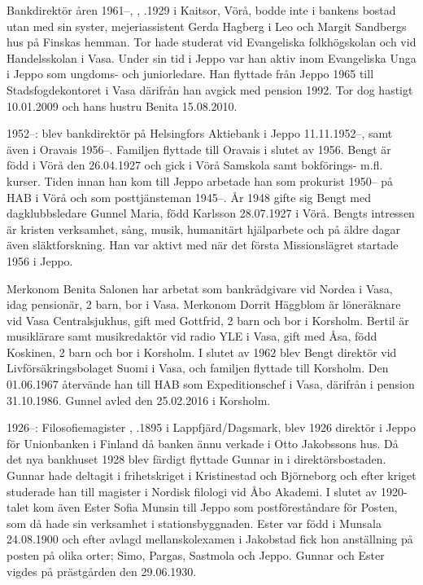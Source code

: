 Bankdirektör åren 1961--, , .1929 i Kaitsor, Vörå, bodde inte i bankens bostad utan med sin syster, mejeriassistent Gerda Hagberg i Leo och Margit Sandbergs hus på Finskas hemman. Tor hade studerat vid Evangeliska folkhögskolan och vid Handelsskolan i Vasa. Under sin tid i Jeppo var han aktiv inom Evangeliska Unga i	Jeppo som ungdoms- och juniorledare. Han flyttade från Jeppo 1965 till Stadsfogdekontoret i Vasa därifrån han avgick med pension 1992. Tor dog hastigt 10.01.2009 och hans hustru Benita 15.08.2010.


1952--:
 blev bankdirektör på Helsingfors Aktiebank i Jeppo 11.11.1952--, samt även i Oravais 1956--. Familjen flyttade till Oravais i slutet av 1956. Bengt är född i Vörå den 26.04.1927 och gick i Vörå Samskola samt bokförings- m.fl. kurser. Tiden innan han kom till Jeppo arbetade han som prokurist 1950-- på HAB i Vörå och som posttjänsteman 1945--. År 1948 gifte sig Bengt med dagklubbsledare Gunnel Maria, född Karlsson 28.07.1927 i Vörå. Bengts intressen är kristen verksamhet, sång, musik, humanitärt hjälparbete och på äldre dagar även släktforskning. Han var aktivt med när det första Missionslägret startade 1956 i Jeppo.
\begin{jhchildren}
  \item {}
  \item {}
  \item {}
\end{jhchildren}
Merkonom Benita Salonen har arbetat som bankrådgivare vid Nordea i Vasa, idag pensionär, 2 barn, bor i Vasa. Merkonom Dorrit Häggblom är löneräknare vid Vasa Centralsjukhus, gift med Gottfrid, 2 barn och bor i Korsholm. Bertil är musiklärare samt musikredaktör vid radio YLE i Vasa, gift med Åsa, född Koskinen, 2 barn och bor i Korsholm. I slutet av 1962 blev Bengt direktör vid Livförsäkringsbolaget Suomi i Vasa, och familjen flyttade till Korsholm. Den 01.06.1967 återvände han till HAB som Expeditionschef i Vasa, därifrån i pension  31.10.1986. Gunnel avled den 25.02.2016 i Korsholm.


1926--:
Filosofiemagister , .1895 i Lappfjärd/Dagsmark, blev 1926 direktör i Jeppo för 	Unionbanken i Finland då banken ännu verkade i Otto Jakobssons hus. Då det nya bankhuset 1928 blev färdigt flyttade Gunnar in i direktörsbostaden. Gunnar hade deltagit i frihetskriget i Kristinestad och Björneborg och efter kriget studerade han till magister i Nordisk filologi vid Åbo Akademi. I slutet av 1920-talet kom även Ester Sofia Munsin till Jeppo som postföreståndare för Posten, som då hade sin verksamhet i stationsbyggnaden. Ester var född i Munsala 24.08.1900 och efter avlagd mellanskolexamen i Jakobstad fick hon anställning på posten på olika orter; Simo, Pargas, Sastmola och Jeppo. Gunnar och Ester vigdes på prästgården den 29.06.1930.

